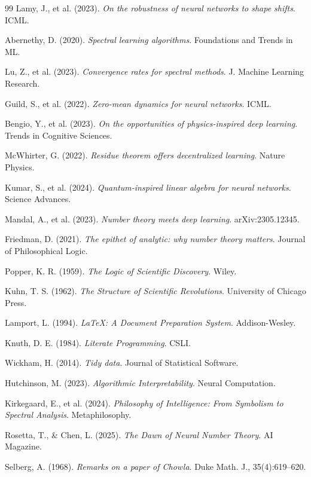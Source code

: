 \documentclass[11pt]{article}
\begin{document}
\begin{thebibliography}{99}
 Lamy, J., et al. (2023). \emph{On the robustness of neural networks to shape shifts}. ICML.

 Abernethy, D. (2020). \emph{Spectral learning algorithms}. Foundations and Trends in ML.

 Lu, Z., et al. (2023). \emph{Convergence rates for spectral methods}. J. Machine Learning Research.

 Guild, S., et al. (2022). \emph{Zero-mean dynamics for neural networks}. ICML.

 Bengio, Y., et al. (2023). \emph{On the opportunities of physics-inspired deep learning}. Trends in Cognitive Sciences.

 McWhirter, G. (2022). \emph{Residue theorem offers decentralized learning}. Nature Physics.

 Kumar, S., et al. (2024). \emph{Quantum-inspired linear algebra for neural networks}. Science Advances.

 Mandal, A., et al. (2023). \emph{Number theory meets deep learning}. arXiv:2305.12345.

 Friedman, D. (2021). \emph{The epithet of analytic: why number theory matters}. Journal of Philosophical Logic.

 Popper, K. R. (1959). \emph{The Logic of Scientific Discovery}. Wiley.

 Kuhn, T. S. (1962). \emph{The Structure of Scientific Revolutions}. University of Chicago Press.

 Lamport, L. (1994). \emph{ LaTeX: A Document Preparation System}. Addison-Wesley.

 Knuth, D. E. (1984). \emph{Literate Programming}. CSLI.

 Wickham, H. (2014). \emph{Tidy data}. Journal of Statistical Software.

 Hutchinson, M. (2023). \emph{Algorithmic Interpretability}. Neural Computation.

 Kirkegaard, E., et al. (2024). \emph{Philosophy of Intelligence: From Symbolism to Spectral Analysis}. Metaphilosophy.

 Rosetta, T., \& Chen, L. (2025). \emph{The Dawn of Neural Number Theory}. AI Magazine.

 Selberg, A. (1968). \emph{Remarks on a paper of Chowla}. Duke Math. J., 35(4):619--620.


\end{thebibliography}
\end{document}
